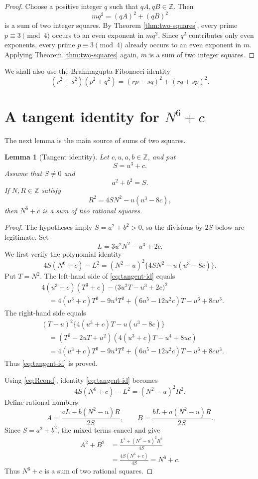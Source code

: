 \documentclass{article}
\theoremstyle{plain}
\theoremstyle{remark}
\theoremstyle{myconjecture}
\theoremstyle{plain}
\newtheorem{lemma}[theorem]{Lemma}
\theoremstyle{definition}
\numberwithin{equation}{section} %
\begin{document}
\begin{proof}
Choose a positive integer \(q\) such that \(qA,qB\in\mathbb Z\).  Then
\[
        mq^2=(qA)^2+(qB)^2
\]
is a sum of two integer squares.  By Theorem \ref{thm:two-squares}, every prime
\(p\equiv3\pmod4\) occurs to an even exponent in \(mq^2\).  Since \(q^2\)
contributes only even exponents, every prime \(p\equiv3\pmod4\) already occurs
to an even exponent in \(m\).  Applying Theorem \ref{thm:two-squares} again,
\(m\) is a sum of two integer squares.
\end{proof}

We shall also use the Brahmagupta-Fibonacci identity
\[
        (r^2+s^2)(p^2+q^2)=(rp-sq)^2+(rq+sp)^2.       \tag{1}\label{eq:bf}
\]

\section{A tangent identity for \texorpdfstring{\(N^6+c\)}{N6+c}}

The next lemma is the main source of sums of two squares.

\begin{lemma}[Tangent identity]\label{lem:tangent}
Let \(c,u,a,b\in\mathbb Z\), and put
\[
        S=u^3+c.
\]
Assume that \(S\ne0\) and
\[
        a^2+b^2=S.
\]
If \(N,R\in\mathbb Z\) satisfy
\[
        R^2=4SN^2-u(u^3-8c),                 \tag{2}\label{eq:Rcond}
\]
then \(N^6+c\) is a sum of two rational squares.
\end{lemma}

\begin{proof}
The hypotheses imply \(S=a^2+b^2>0\), so the divisions by \(2S\) below are
legitimate.  Set
\[
        L=3u^2N^2-u^3+2c.
\]
We first verify the polynomial identity
\[
        4S(N^6+c)-L^2
        =(N^2-u)^2\{4SN^2-u(u^3-8c)\}.            \tag{3}\label{eq:tangent-id}
\]
Put \(T=N^2\).  The left-hand side of \eqref{eq:tangent-id} equals
\[
\begin{aligned}
&4(u^3+c)(T^3+c)-\bigl(3u^2T-u^3+2c\bigr)^2  \\
&\quad=4(u^3+c)T^3-9u^4T^2+(6u^5-12u^2c)T-u^6+8cu^3.
\end{aligned}
\]
The right-hand side equals
\[
\begin{aligned}
&(T-u)^2\{4(u^3+c)T-u(u^3-8c)\} \\
&\quad=(T^2-2uT+u^2)(4(u^3+c)T-u^4+8uc) \\
&\quad=4(u^3+c)T^3-9u^4T^2+(6u^5-12u^2c)T-u^6+8cu^3.
\end{aligned}
\]
Thus \eqref{eq:tangent-id} is proved.

Using \eqref{eq:Rcond}, identity \eqref{eq:tangent-id} becomes
\[
        4S(N^6+c)-L^2=(N^2-u)^2R^2.
\]
Define rational numbers
\[
        A=\frac{aL-b(N^2-u)R}{2S},
        \qquad
        B=\frac{bL+a(N^2-u)R}{2S}.
\]
Since \(S=a^2+b^2\), the mixed terms cancel and give
\[
\begin{aligned}
        A^2+B^2
        &=\frac{L^2+(N^2-u)^2R^2}{4S} \\
        &=\frac{4S(N^6+c)}{4S}
        =N^6+c.
\end{aligned}
\]
Thus \(N^6+c\) is a sum of two rational squares.
\end{proof}
\end{document}
